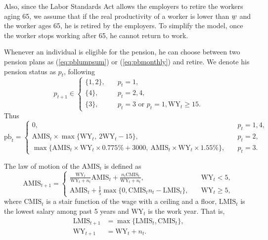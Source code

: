 \documentclass[12pt]{article}
\begin{document}
\begin{CJK*}{UTF8}{bsmi}
Also, since the Labor Standards Act allows the employers to 
retire the workers aging 65, we assume that if the real 
productivity of a worker is lower than 
\(\underaccent{\bar}{w}\) and the worker ages 65, he is 
retired by the employers. To simplify the model, once the 
worker stops working after 65, he cannot return to work. 

Whenever an individual is eligible for the pension, he can 
choose between two pension plans as (\ref{eq:pblumpsum}) or 
(\ref{eq:pbmonthly}) and retire. We denote his pension status 
as \(p_t\), following
\begin{equation}
    p_{t+1}\in
    \begin{cases}
        \{1,2\},\quad & p_t=1, \\
        \{4\},\quad & p_t=2,4, \\
        \{3\},\quad &p_t=3\text{ or }p_t=1,\text{WY}_t\geq15.
    \end{cases}
\end{equation}
Thus 
\begin{equation}
    \text{pb}_t = 
    \begin{cases}
        0, &\quad p_t=1,4,\\
        \text{AMIS}_t\times\max\{\text{WY}_t,\ 2\text{WY}_t-15\}, &\quad p_t=2,\\
        \max\{\text{AMIS}_t\times\text{WY}_t\times0.775\%+3000,\ \text{AMIS}_t\times\text{WY}_t\times 1.55\%\}, &\quad p_t=3.
    \end{cases}
\end{equation}

The law of motion of the \(\text{AMIS}_t\) is defined as 
\begin{equation}
    \text{AMIS}_{t+1} = 
    \begin{cases}
        \frac{\text{WY}_t}{\text{WY}_t+n_t}\text{AMIS}_t + \frac{n_t\text{CMIS}_t}{\text{WY}_t+n_t}, \quad &\text{WY}_t<5,\\
        \text{AMIS}_t + \frac{1}{5}\max\{0,\text{CMIS}_tn_t-\text{LMIS}_t\}, \quad &\text{WY}_t\geq5,
    \end{cases}
\end{equation}
where \(\text{CMIS}_t\) is a stair function of the wage with 
a ceiling and a floor, \(\text{LMIS}_t\) is the lowest salary 
among past 5 years and \(\text{WY}_t\) is the work year. That 
is,
\begin{align}
    \text{LMIS}_{t+1} &= \max\{\text{LMIS}_t,\text{CMIS}_t\},\\
    \text{WY}_{t+1} &= \text{WY}_t + n_t.
\end{align}


\end{CJK*}
\end{document}
